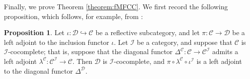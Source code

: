 \documentclass[12pt, a4paper]{amsart}
\theoremstyle{definition}
\newtheorem{proposition}[theorem]{Proposition}
\begin{document}
Finally, we prove Theorem \ref{theorem:fMFCC}. We first record the following proposition, which follows, for example, from \cite[Proposition 4.5.15 (ii)]{Riehl2016category}:

\begin{proposition}\label{proposition:FCC_reflect}
Let $\iota : \mathcal{D}\hookrightarrow\mathcal{C}$ be a reflective subcategory, and let $\pi : \mathcal{C} \rightarrow \mathcal{D}$ be a left adjoint to the inclusion functor $\iota$. Let $\mathcal{I}$ be a category, and suppose that $\mathcal{C}$ is $\mathcal{I}$-cocomplete; that is, suppose that the diagonal functor $\Delta^\mathcal{C} : \mathcal{C} \rightarrow \mathcal{C}^\mathcal{I}$ admits a left adjoint $\lambda^\mathcal{C} : \mathcal{C}^\mathcal{I} \rightarrow \mathcal{C}$. Then $\mathcal{D}$ is $\mathcal{I}$-cocomplete, and $\pi \circ \lambda^{\mathcal{C}} \circ \iota^\mathcal{I}$ is a left adjoint to the diagonal functor $\Delta^{\mathcal{D}}$.
\end{proposition}
\end{document}
